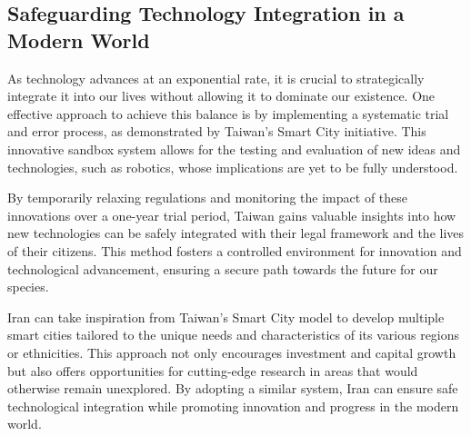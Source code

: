 \documentclass{IEEEtran}
\begin{document}
\subsection{Safeguarding Technology Integration in a Modern World}

As technology advances at an exponential rate, it is crucial to strategically integrate it into our lives without allowing it to dominate our existence. One effective approach to achieve this balance is by implementing a systematic trial and error process, as demonstrated by Taiwan's Smart City initiative. This innovative sandbox system allows for the testing and evaluation of new ideas and technologies, such as robotics, whose implications are yet to be fully understood.

By temporarily relaxing regulations and monitoring the impact of these innovations over a one-year trial period, Taiwan gains valuable insights into how new technologies can be safely integrated with their legal framework and the lives of their citizens. This method fosters a controlled environment for innovation and technological advancement, ensuring a secure path towards the future for our species.

Iran can take inspiration from Taiwan's Smart City model to develop multiple smart cities tailored to the unique needs and characteristics of its various regions or ethnicities. This approach not only encourages investment and capital growth but also offers opportunities for cutting-edge research in areas that would otherwise remain unexplored. By adopting a similar system, Iran can ensure safe technological integration while promoting innovation and progress in the modern world.




\end{document}
